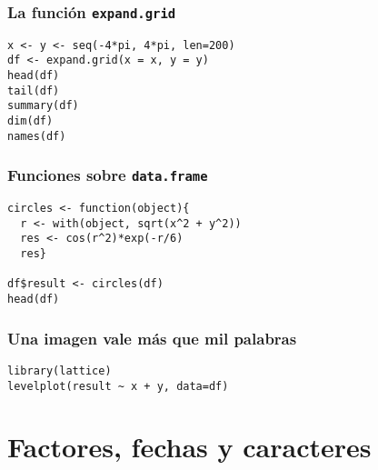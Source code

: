 \documentclass[xcolor={usenames,svgnames,dvipsnames}]{beamer}
\begin{document}
\begin{frame}[fragile]
\frametitle{La función \texttt{expand.grid}}
\label{sec-4-2-4}



\lstset{language=R}
\begin{lstlisting}
x <- y <- seq(-4*pi, 4*pi, len=200)
df <- expand.grid(x = x, y = y)
head(df)
tail(df)
summary(df)
dim(df)
names(df)
\end{lstlisting}
\end{frame}
\begin{frame}[fragile]
\frametitle{Funciones sobre \texttt{data.frame}}
\label{sec-4-2-5}



\lstset{language=R}
\begin{lstlisting}
circles <- function(object){
  r <- with(object, sqrt(x^2 + y^2))
  res <- cos(r^2)*exp(-r/6)
  res}

df$result <- circles(df)
head(df)
\end{lstlisting}
\end{frame}
\begin{frame}[fragile]
\frametitle{Una imagen vale más que mil palabras}
\label{sec-4-2-6}


\lstset{language=R}
\begin{lstlisting}
library(lattice)
levelplot(result ~ x + y, data=df)
\end{lstlisting}
\end{frame}
\section{Factores, fechas y caracteres}
\label{sec-5}
\end{document}
